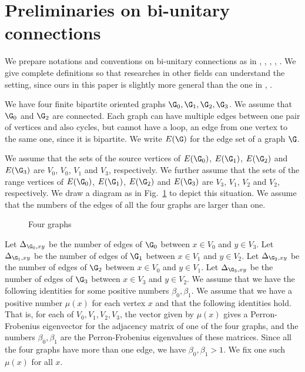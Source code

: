 \documentclass[12pt]{article}
\begin{document}
\section{Preliminaries on bi-unitary connections}

We prepare notations and conventions on bi-unitary connections
as in \cite{AH},
\cite[Chapter 11]{EK1}, \cite{K1}, \cite{O}, \cite{Sc}.
We give complete definitions so that researches in other
fields can understand the setting, since
ours in this paper is slightly more general than the one
in \cite{K2}, \cite{K3}.

We have four finite bipartite oriented
graphs $\G_0,\G_1,\G_2,\G_3$.  We assume that 
$\G_0$ and $\G_2$ are connected.    Each graph can have
multiple edges between one pair of vertices and also cycles,
but cannot have a loop, an edge from one vertex to the same one,
since it is bipartite.  We write $E(\G)$ for
the edge set of a graph $\G$.

We assume that
the sets of the source vertices of $E(\G_0)$,
$E(\G_1)$, $E(\G_2)$ and $E(\G_3)$ are 
$V_0$, $V_0$, $V_1$ and $V_3$, respectively. 
We further assume that the sets of the range vertices of $E(\G_0)$,
$E(\G_1)$, $E(\G_2)$ and $E(\G_3)$ are 
$V_3$, $V_1$, $V_2$ and $V_2$, respectively. 
We draw a diagram as in Fig.~\ref{four} to depict this
situation.  
We assume that the numbers of the edges
of all the four graphs are larger than one.

\begin{figure}[H]
\begin{center}
\caption{Four graphs}
\label{four}
\end{center}
\end{figure}

Let $\Delta_{\G_0,xy}$ be the number of edges of $\G_0$ between
$x\in V_0$ and $y\in V_3$.
Let $\Delta_{\G_1,xy}$ be the number of edges of $\G_1$ between
$x\in V_1$ and $y\in V_2$.
Let $\Delta_{\G_2,xy}$ be the number of edges of $\G_2$ between
$x\in V_0$ and $y\in V_1$.
Let $\Delta_{\G_3,xy}$ be the number of edges of $\G_3$ between
$x\in V_3$ and $y\in V_2$.  We assume that we have the following
identities for some positive numbers $\beta_0,\beta_1$.
We assume that we
have a positive number $\mu(x)$ for each vertex $x$
and that the following identities hold.  That is, for each of
$V_0, V_1, V_2, V_3$, the vector given by $\mu(x)$ gives a
Perron-Frobenius eigenvector for the adjacency matrix of one 
of the four graphs, and the numbers $\beta_0,\beta_1$ are
the Perron-Frobenius eigenvalues of these matrices.
Since all the four graphs have more than one edge, we have
$\beta_0,\beta_1 > 1$.  We fix one such $\mu(x)$ for all $x$.
\end{document}
